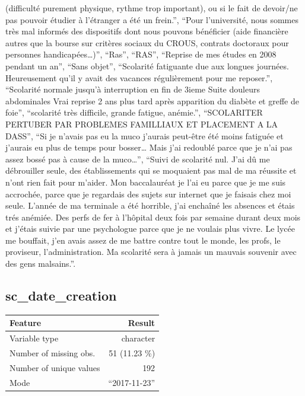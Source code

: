 \documentclass[
  letterpaper,
  DIV=11,
  numbers=noendperiod]{scrartcl}
\begin{document}
\begin{itemize}
  (difficulté purement physique, rythme trop important), ou si le fait
  de devoir/ne pas pouvoir étudier à l'étranger a été un frein.'',
  ``Pour l'université, nous sommes très mal informés des dispositifs
  dont nous pouvons bénéficier (aide financière autres que la bourse sur
  critères sociaux du CROUS, contrats doctoraux pour personnes
  handicapées\ldots)'', ``Ras'', ``RAS'', ``Reprise de mes études en
  2008 pendant un an'', ``Sans objet'', ``Scolarité fatiguante due aux
  longues journées. Heureusement qu'il y avait des vacances
  régulièrement pour me reposer.'', ``Scolarité normale jusqu'à
  interruption en fin de 3ieme Suite douleurs abdominales Vrai reprise 2
  ans plus tard après apparition du diabète et greffe de foie'',
  ``scolarité très difficile, grande fatigue, anémie.'', ``SCOLARITER
  PERTUBER PAR PROBLEMES FAMILLIAUX ET PLACEMENT A LA DASS'', ``Si je
  n'avais pas eu la muco j'aurais peut-être été moins fatiguée et
  j'aurais eu plus de temps pour bosser\ldots{} Mais j'ai redoublé parce
  que je n'ai pas assez bossé pas à cause de la muco\ldots{}'', ``Suivi
  de scolarité nul. J'ai dû me débrouiller seule, des établissements qui
  se moquaient pas mal de ma réussite et n'ont rien fait pour m'aider.
  Mon baccalauréat je l'ai eu parce que je me suis accrochée, parce que
  je regardais des sujets sur internet que je faisais chez moi seule.
  L'année de ma terminale a été horrible, j'ai enchaîné les absences et
  étais trés anémiée. Des perfs de fer à l'hôpital deux fois par semaine
  durant deux mois et j'étais suivie par une psychologue parce que je ne
  voulais plus vivre. Le lycée me bouffait, j'en avais assez de me
  battre contre tout le monde, les profs, le proviseur,
  l'administration. Ma scolarité sera à jamais un mauvais souvenir avec
  des gens malsains.''.
\end{itemize}

\fullline

\subsection{sc\_date\_creation}\label{sc_date_creation}

\bminione

\begin{longtable}[]{@{}lr@{}}
\toprule\noalign{}
Feature & Result \\
\midrule\noalign{}
\endhead
\bottomrule\noalign{}
\endlastfoot
Variable type & character \\
Number of missing obs. & 51 (11.23 \%) \\
Number of unique values & 192 \\
Mode & ``2017-11-23'' \\
\end{longtable}
\end{document}
